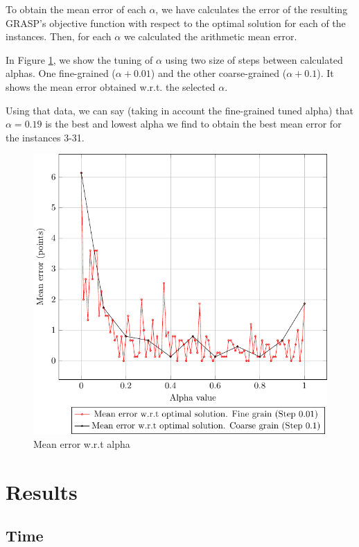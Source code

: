 \documentclass[a4paper, 10pt]{article}
\begin{document}
To obtain the mean error of each $\alpha$, we have calculates the error of the resulting GRASP's objective function with respect to the optimal solution for each of the instances. Then, for each $\alpha$ we calculated the arithmetic mean error. 

In Figure \ref{fig:error}, we show the tuning of $\alpha$ using two size of steps between calculated alphas. One fine-grained ($\alpha + 0.01$) and the other coarse-grained ($\alpha + 0.1$). It shows the mean error obtained w.r.t. the selected $\alpha$. 

Using that data, we can say (taking in account the fine-grained tuned alpha) that $\alpha = 0.19$ is the best and lowest alpha we find to obtain the best mean error for the instances 3-31.


\begin{figure}[H]
    \includegraphics[width=\linewidth]{plots/error.pdf}
    \caption{Mean error w.r.t alpha}
    \label{fig:error}
\end{figure}

\section{Results}

\clearpage

\subsection{Time}
\end{document}
